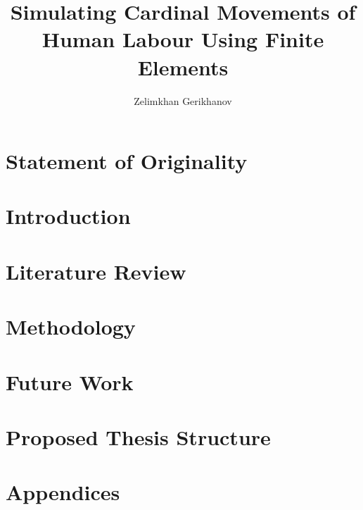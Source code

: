 \documentclass[oneside,12pt]{CUEDthesisPSnPDF}
\title{Simulating Cardinal Movements of Human Labour Using Finite Elements}
\author{Zelimkhan Gerikhanov}
\begin{document}
\maketitle

\listoffixmes
{}
\tableofcontents
\listoffigures
\listoftables


\chapter*{Statement of Originality}

\clearpage
{}

\chapter{Introduction}\label{chap-introduction}


\chapter{Literature Review}\label{chap-literature}


\chapter{Methodology}\label{chap-methodology}






\chapter{Future Work}\label{chap-future}


\chapter{Proposed Thesis Structure}\label{chap-thesis}



%


\chapter{Appendices}


\end{document}
